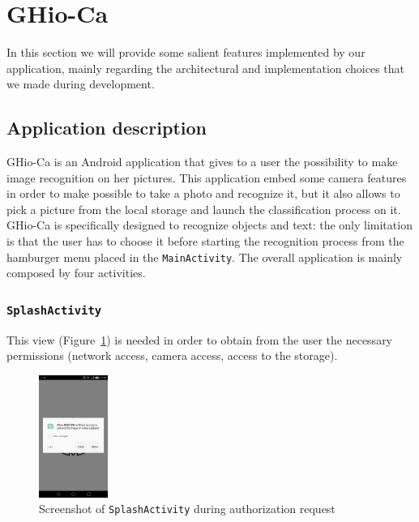 \section{GHio-Ca}
\label{sec:ghioca}
In this section we will provide some salient features implemented by our
application, mainly regarding the architectural and implementation choices that
we made during development.

\subsection{Application description}
GHio-Ca is an Android application that gives to a user the possibility to make
image recognition on her pictures. This application embed some camera features
in order to make possible to take a photo and recognize it, but it also allows
to pick a picture from the local storage and launch the classification process
on it.
GHio-Ca is specifically designed to recognize objects and text: the only
limitation is that the user has to choose it before starting the recognition
process from the hamburger menu placed in the \texttt{MainActivity}.
The overall application is mainly composed by four activities.

\subsubsection{\texttt{SplashActivity}}
This view (Figure~\ref{fig:splash}) is needed in order to obtain from the user
the necessary permissions (network access, camera access, access to  the
storage).
\begin{figure}[h]
    \centering
    \includegraphics[width=0.2\textwidth]{../img/splash}
    \caption{Screenshot of \texttt{SplashActivity} during authorization request}
    \label{fig:splash}
\end{figure}


